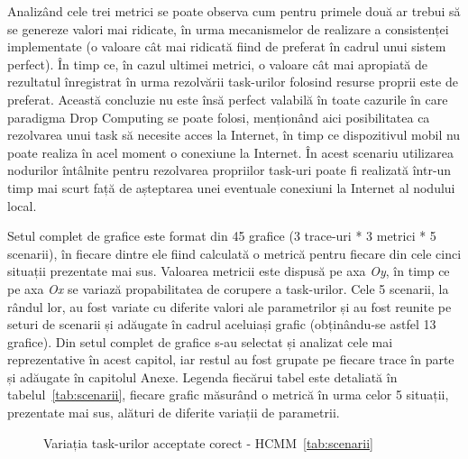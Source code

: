 \documentclass[12pt,a4paper]{report}
\begin{document}
Analizând cele trei metrici se poate observa cum pentru primele două ar trebui să se genereze valori mai ridicate, în urma mecanismelor de realizare a consistenței implementate (o valoare cât mai ridicată fiind de preferat în cadrul unui sistem perfect). În timp ce, în cazul ultimei metrici, o valoare cât mai apropiată de rezultatul înregistrat în urma rezolvării task-urilor folosind resurse proprii este de preferat. Această concluzie nu este însă perfect valabilă în toate cazurile în care paradigma Drop Computing se poate folosi, menționând aici posibilitatea ca rezolvarea unui task să necesite acces la Internet, în timp ce dispozitivul mobil nu poate realiza în acel moment o conexiune la Internet. În acest scenariu utilizarea nodurilor întâlnite pentru rezolvarea propriilor task-uri poate fi realizată într-un timp mai scurt față de așteptarea unei eventuale conexiuni la Internet al nodului local.

Setul complet de grafice este format din 45 grafice (3 trace-uri * 3 metrici * 5 scenarii), în fiecare dintre ele fiind calculată o metrică pentru fiecare din cele cinci situații prezentate mai sus. Valoarea metricii este dispusă pe axa \textit{Oy}, în timp ce pe axa \textit{Ox} se variază propabilitatea de corupere a task-urilor. Cele 5 scenarii, la rândul lor, au fost variate cu diferite valori ale parametrilor și au fost reunite pe seturi de scenarii și adăugate în cadrul aceluiași grafic (obținându-se astfel 13 grafice). Din setul complet de grafice s-au selectat și analizat cele mai reprezentative în acest capitol, iar restul au fost grupate pe fiecare trace în parte și adăugate în capitolul Anexe. Legenda fiecărui tabel este detaliată în tabelul~\ref{tab:scenarii}, fiecare grafic măsurând o metrică în urma celor 5 situații, prezentate mai sus, alături de diferite variații de parametrii.

\begin{figure}%
    \centering
    \qquad
    \caption[~\ref{tab:scenarii}]{Variația task-urilor acceptate corect - HCMM~\ref{tab:scenarii}}%
    \label{fig:metric1HCMM}%
\end{figure}
\end{document}
